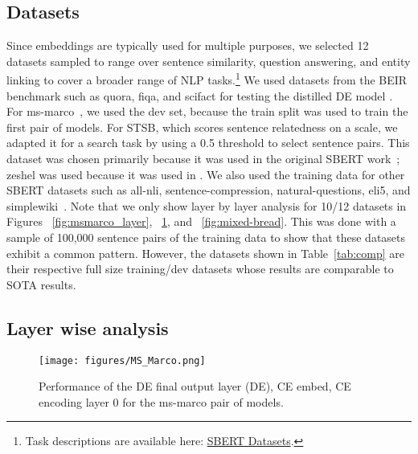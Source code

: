 \subsection{Datasets}
 Since embeddings are typically used for multiple purposes, we selected 12 datasets sampled to range over sentence similarity, question answering, and entity linking to cover a broader range of NLP tasks.\footnote{Task descriptions are available here: \href{https://sbert.net/docs/sentence_transformer/dataset_overview.html}{SBERT Datasets}.} We used datasets from the BEIR benchmark \cite{Thakur2021Beir} such as quora, fiqa, and scifact for testing the distilled DE model \cite{quora-question-pairs, Wadden2020Scifact, Maia2018Fiqa}. For ms-marco~\cite{nguyen2016ms}, we used the dev set, because the train split was used to train the first pair of models. For STSB, which scores sentence relatedness on a scale, we adapted it for a search task by using a 0.5 threshold to select sentence pairs. This dataset was chosen primarily because it was used in the original SBERT work~\cite{reimers-2019-sentence-bert}; zeshel was used because it was used in \cite{yadav2022efficient}. We also used the training data for other SBERT datasets such as all-nli, sentence-compression, natural-questions, eli5, and simplewiki~\cite{bowman-etal-2015-large, filippova-altun-2013-overcoming, 47761, fan-etal-2019-eli5, coster-kauchak-2011-simple}. Note that we only show layer by layer analysis for 10/12 datasets in Figures ~\ref{fig:msmarco_layer}, ~\ref{fig:msmarco}, and ~\ref{fig:mixed-bread}. This was done with a sample of 100,000 sentence pairs of the training data to show that these datasets exhibit a common pattern. However, the datasets shown in Table~\ref{tab:comp} are their respective full size training/dev datasets whose results are comparable to SOTA results.   

\subsection{Layer wise analysis}

\begin{figure}[!t]
    \centering
    \texttt{[image: figures/MS\_Marco.png]}
    \caption{Performance of the DE final output layer (DE), CE embed, CE encoding layer 0 for the ms-marco pair of models.}
    \label{fig:msmarco}
\end{figure}

